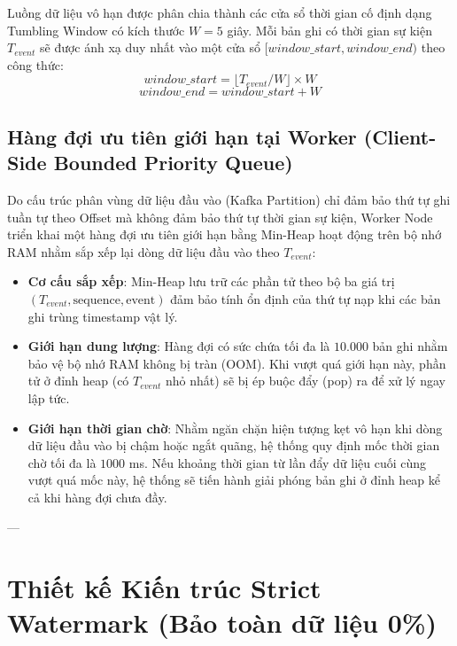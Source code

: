 \documentclass[12pt,a4paper]{article}
\begin{document}
Luồng dữ liệu vô hạn được phân chia thành các cửa sổ thời gian cố định dạng Tumbling Window có kích thước $W = 5$ giây. Mỗi bản ghi có thời gian sự kiện $T_{event}$ sẽ được ánh xạ duy nhất vào một cửa sổ $[window\_start, window\_end)$ theo công thức:
\begin{equation}
window\_start = \lfloor T_{event} / W \rfloor \times W
\end{equation}
\begin{equation}
window\_end = window\_start + W
\end{equation}

\subsection{Hàng đợi ưu tiên giới hạn tại Worker (Client-Side Bounded Priority Queue)}
Do cấu trúc phân vùng dữ liệu đầu vào (Kafka Partition) chỉ đảm bảo thứ tự ghi tuần tự theo Offset mà không đảm bảo thứ tự thời gian sự kiện, Worker Node triển khai một hàng đợi ưu tiên giới hạn bằng Min-Heap hoạt động trên bộ nhớ RAM nhằm sắp xếp lại dòng dữ liệu đầu vào theo $T_{event}$:
\begin{itemize}
    \item \textbf{Cơ cấu sắp xếp}: Min-Heap lưu trữ các phần tử theo bộ ba giá trị $(T_{event}, \text{sequence}, \text{event})$ đảm bảo tính ổn định của thứ tự nạp khi các bản ghi trùng timestamp vật lý.
    \item \textbf{Giới hạn dung lượng}: Hàng đợi có sức chứa tối đa là $10.000$ bản ghi nhằm bảo vệ bộ nhớ RAM không bị tràn (OOM). Khi vượt quá giới hạn này, phần tử ở đỉnh heap (có $T_{event}$ nhỏ nhất) sẽ bị ép buộc đẩy (pop) ra để xử lý ngay lập tức.
    \item \textbf{Giới hạn thời gian chờ}: Nhằm ngăn chặn hiện tượng kẹt vô hạn khi dòng dữ liệu đầu vào bị chậm hoặc ngắt quãng, hệ thống quy định mốc thời gian chờ tối đa là $1000$ ms. Nếu khoảng thời gian từ lần đẩy dữ liệu cuối cùng vượt quá mốc này, hệ thống sẽ tiến hành giải phóng bản ghi ở đỉnh heap kể cả khi hàng đợi chưa đầy.
\end{itemize}

---

\section{Thiết kế Kiến trúc Strict Watermark (Bảo toàn dữ liệu 0\%)}
\end{document}
